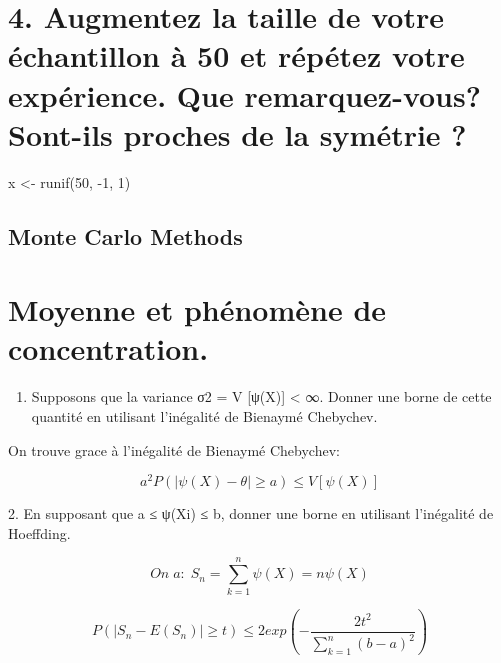 \documentclass[
]{article}
\newenvironment{Shaded}{\begin{snugshade}}{\end{snugshade}}
\newcommand{\DecValTok}[1]{\textcolor[rgb]{0.00,0.00,0.81}{#1}}
\newcommand{\FunctionTok}[1]{\textcolor[rgb]{0.00,0.00,0.00}{#1}}
\newcommand{\NormalTok}[1]{#1}
\newcommand{\OtherTok}[1]{\textcolor[rgb]{0.56,0.35,0.01}{#1}}
\newcommand{\SpecialCharTok}[1]{\textcolor[rgb]{0.00,0.00,0.00}{#1}}
\providecommand{\tightlist}{%
  \setlength{\itemsep}{0pt}\setlength{\parskip}{0pt}}
\begin{document}
\hypertarget{augmentez-la-taille-de-votre-uxe9chantillon-uxe0-50-et-ruxe9puxe9tez-votre-expuxe9rience.-que-remarquez-vous-sont-ils-proches-de-la-symuxe9trie}{%
\section{4. Augmentez la taille de votre échantillon à 50 et répétez
votre expérience. Que remarquez-vous? Sont-ils proches de la symétrie
?}\label{augmentez-la-taille-de-votre-uxe9chantillon-uxe0-50-et-ruxe9puxe9tez-votre-expuxe9rience.-que-remarquez-vous-sont-ils-proches-de-la-symuxe9trie}}

\begin{Shaded}
\begin{Highlighting}[]
\NormalTok{x }\OtherTok{\textless{}{-}} \FunctionTok{runif}\NormalTok{(}\DecValTok{50}\NormalTok{, }\SpecialCharTok{{-}}\DecValTok{1}\NormalTok{, }\DecValTok{1}\NormalTok{)}
\end{Highlighting}
\end{Shaded}

\hypertarget{monte-carlo-methods}{%
\subsection{Monte Carlo Methods}\label{monte-carlo-methods}}

\hypertarget{moyenne-et-phuxe9nomuxe8ne-de-concentration.}{%
\section{Moyenne et phénomène de
concentration.}\label{moyenne-et-phuxe9nomuxe8ne-de-concentration.}}

\begin{enumerate}
\def\labelenumi{\arabic{enumi}.}
\tightlist
\item
  Supposons que la variance σ2 = V {[}ψ(X){]} \textless{} ∞. Donner une
  borne de cette quantité en utilisant l'inégalité de Bienaymé
  Chebychev.
\end{enumerate}

On trouve grace à l'inégalité de Bienaymé Chebychev:

\[
a^{2}P(|\psi(X) - \theta| \ge a) \le V[\psi(X)]
\]

2. En supposant que a ≤ ψ(Xi) ≤ b, donner une borne en utilisant
l'inégalité de Hoeffding.

\[
On\;a:\;S_{n} = \sum_{k=1}^{n}\psi(X)=n\psi(X)
\]

\[
P(|S_{n}-E(S_{n})| \ge t) \le 2exp(-\frac{2t^{2}}{\sum_{k=1}^{n}(b-a)^{2}})
\]
\end{document}

